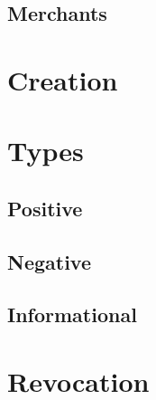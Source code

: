 \subsection{Merchants}

\section{Creation}

\section{Types}

\subsection{Positive}

\subsection{Negative}

\subsection{Informational}

\section{Revocation}
